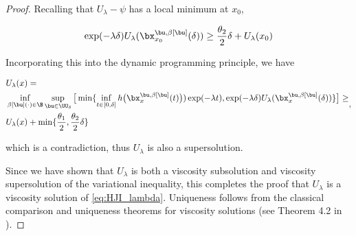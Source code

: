 \begin{for_journal}
\begin{proof}
Recalling that $U_{\lambda}-\psi$ has a local minimum at $x_0$,

\begin{equation}
\exp(-\lambda \delta)U_{\lambda}(\bx_{x_0}^{\bu,\beta[\bu]}(\delta)) \geq \frac{\theta_2}{2} \delta + U_{\lambda}(x_0)
\end{equation}

Incorporating this into the dynamic programming principle, we have

\begin{equation} 
\begin{split}
&U_{\lambda}(x) =\\ 
&\inf_{\beta[\bu](\cdot) \in \B} \sup_{\bu \in \UU_\delta} 
\big [\min\{\inf_{t \in [0, \delta]} h\big(\bx_{x}^{\bu,\beta[\bu]}(t)\big))\exp(-\lambda  t), \exp(-\lambda \delta)U_{\lambda}(\bx_{x}^{\bu,\beta[\bu]}(\delta))\} 
\big ]\geq\\
&U_{\lambda}(x) + \min\{\frac{\theta_1}{2}, \frac{\theta_2}{2} \delta \}
\end{split},
\end{equation}

 
\noindent which is a contradiction, thus $U_{\lambda}$ is also a supersolution.

Since we have shown that $U_{\lambda}$ is both a viscosity subsolution and viscosity supersolution of the variational inequality, this completes the proof that $U_{\lambda}$ is a viscosity solution of \eqref{eq:HJI_lambda}. Uniqueness follows from the classical comparison and uniqueness theorems for viscosity solutions (see Theorem 4.2 in \cite{Barron1989}).
\end{proof}
\end{for_journal}
